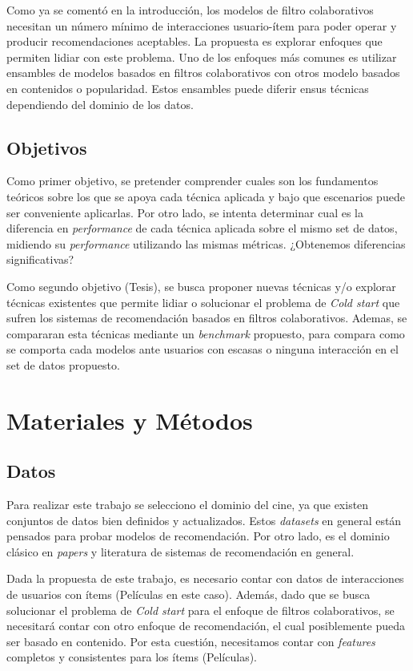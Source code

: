 \documentclass[11pt,a4paper,twoside]{thesis}
\begin{document}
Como ya se comentó en la introducción, los modelos de filtro colaborativos
necesitan un número mínimo de interacciones usuario-ítem para poder operar y
producir recomendaciones aceptables. La propuesta es explorar enfoques que
permiten lidiar con este problema. Uno de los enfoques más comunes es utilizar
ensambles de modelos basados en filtros colaborativos con otros modelo basados
en contenidos o popularidad. Estos ensambles puede diferir ensus técnicas
dependiendo del dominio de los datos.

\section{Objetivos}

Como primer objetivo, se pretender comprender cuales son los fundamentos
teóricos sobre los que se apoya cada técnica aplicada y bajo que escenarios
puede ser conveniente aplicarlas. Por otro lado, se intenta determinar cual es
la diferencia en \textit{performance} de cada técnica aplicada sobre el mismo
set de datos, midiendo su \textit{performance} utilizando las mismas métricas.
¿Obtenemos diferencias significativas?

Como segundo objetivo (Tesis), se busca proponer nuevas técnicas y/o explorar
técnicas existentes que permite lidiar o solucionar el problema de \textit{Cold
	start} que sufren los sistemas de recomendación basados en filtros
colaborativos. Ademas, se compararan esta técnicas mediante un
\textit{benchmark} propuesto, para compara como se comporta cada modelos ante
usuarios con escasas o ninguna interacción en el set de datos propuesto.

\chapter{Materiales y Métodos}

\section{Datos}

Para realizar este trabajo se selecciono el dominio del cine, ya que existen
conjuntos de datos bien definidos y actualizados. Estos \textit{datasets} en
general están pensados para probar modelos de recomendación. Por otro lado, es
el dominio clásico en \textit{papers} y literatura de sistemas de recomendación
en general.

Dada la propuesta de este trabajo, es necesario contar con datos de
interacciones de usuarios con ítems (Películas en este caso). Además, dado que
se busca solucionar el problema de \textit{Cold start} para el enfoque de
filtros colaborativos, se necesitará contar con otro enfoque de recomendación,
el cual posiblemente pueda ser basado en contenido. Por esta cuestión,
necesitamos contar con \textit{features} completos y consistentes para los
ítems (Películas).
\end{document}
